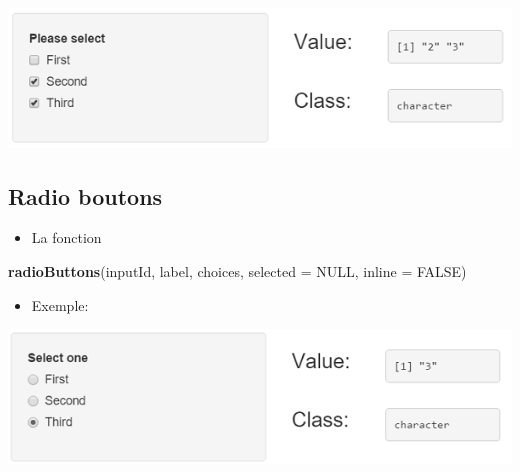 \documentclass[
]{article}
\newenvironment{Shaded}{\begin{snugshade}}{\end{snugshade}}
\newcommand{\AttributeTok}[1]{\textcolor[rgb]{0.13,0.29,0.53}{#1}}
\newcommand{\CommentTok}[1]{\textcolor[rgb]{0.56,0.35,0.01}{\textit{#1}}}
\newcommand{\ConstantTok}[1]{\textcolor[rgb]{0.56,0.35,0.01}{#1}}
\newcommand{\DecValTok}[1]{\textcolor[rgb]{0.00,0.00,0.81}{#1}}
\newcommand{\FunctionTok}[1]{\textcolor[rgb]{0.13,0.29,0.53}{\textbf{#1}}}
\newcommand{\NormalTok}[1]{#1}
\newcommand{\OtherTok}[1]{\textcolor[rgb]{0.56,0.35,0.01}{#1}}
\newcommand{\StringTok}[1]{\textcolor[rgb]{0.31,0.60,0.02}{#1}}
\providecommand{\tightlist}{%
  \setlength{\itemsep}{0pt}\setlength{\parskip}{0pt}}
\begin{document}
\includegraphics{img/multiple_checkbox.png}

\hypertarget{radio-boutons}{%
\subsection{Radio boutons}\label{radio-boutons}}

\begin{itemize}
\tightlist
\item
  La fonction
\end{itemize}

\begin{Shaded}
\begin{Highlighting}[]
\FunctionTok{radioButtons}\NormalTok{(inputId, label, choices, }\AttributeTok{selected =} \ConstantTok{NULL}\NormalTok{, }\AttributeTok{inline =} \ConstantTok{FALSE}\NormalTok{)}
\end{Highlighting}
\end{Shaded}

\begin{itemize}
\tightlist
\item
  Exemple:
\end{itemize}

\begin{Shaded}
\end{Shaded}

\includegraphics{img/radio.png}
\end{document}
